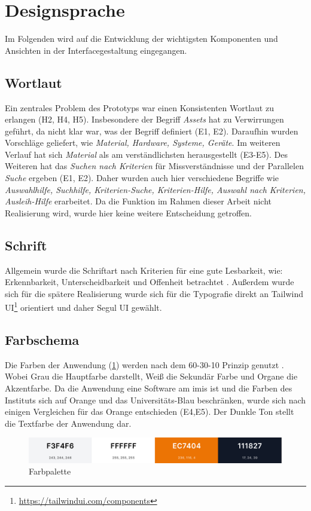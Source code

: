 \section{Designsprache}

Im Folgenden wird auf die Entwicklung der wichtigsten Komponenten und Ansichten in der
Interfacegestaltung eingegangen.

\subsection{Wortlaut}
Ein zentrales Problem des Prototyps war einen Konsistenten Wortlaut zu erlangen (H2, H4, H5).
Insbesondere der Begriff \textit{Assets} hat zu Verwirrungen geführt, da nicht klar war, was der
Begriff definiert (E1, E2). Daraufhin wurden Vorschläge geliefert, wie \textit{Material, Hardware,
    Systeme, Geräte}. Im weiteren Verlauf hat sich \textit{Material} als am verständlichsten
herausgestellt (E3-E5). Des Weiteren hat das \textit{Suchen nach Kriterien} für Missverständnisse
und der Parallelen \textit{Suche} ergeben (E1, E2). Daher wurden auch hier verschiedene Begriffe wie
\textit{Auswahlhilfe, Suchhilfe, Kriterien-Suche, Kriterien-Hilfe, Auswahl nach Kriterien, Ausleih-Hilfe}
erarbeitet. Da die Funktion im Rahmen dieser Arbeit nicht Realisierung wird, wurde hier keine
weitere Entscheidung getroffen.

\subsection{Schrift}
Allgemein wurde die Schriftart nach Kriterien für eine gute Lesbarkeit, wie: Erkennbarkeit,
Unterscheidbarkeit und Offenheit betrachtet \cite{kommunikationsdesign_leserlichinfo}. Außerdem
wurde sich für die spätere Realisierung wurde sich für die Typografie direkt an Tailwind
UI\footnote{\url{https://tailwindui.com/components}} orientiert und daher Segul UI gewählt.


\subsection{Farbschema}
Die Farben der Anwendung (\ref{fig:farben}) werden nach dem 60-30-10 Prinzip genutzt
\cite{experience_using}. Wobei Grau die Hauptfarbe darstellt, Weiß die Sekundär Farbe und Organe die
Akzentfarbe. Da die Anwendung eine Software am \ac{imis} ist und die Farben des Instituts sich auf
Orange und das Universitäts-Blau beschränken, wurde sich nach einigen Vergleichen für das Orange
entschieden (E4,E5). Der Dunkle Ton stellt die Textfarbe der Anwendung dar.
\begin{figure}[h]
    \centering
    \includegraphics[scale=0.23]{Bilder/farben.png}
    \caption[Farbpalette]{Farbpalette}
    \label{fig:farben}
\end{figure}

